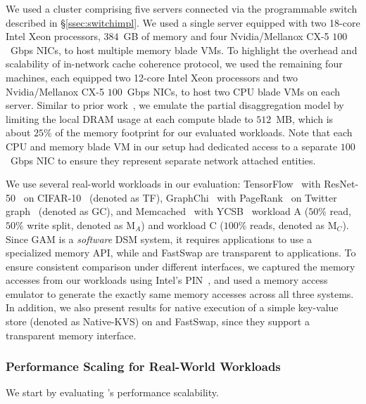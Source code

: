  We used a cluster comprising five servers connected via the programmable switch described in \S\ref{ssec:switchimpl}. We used a single server equipped with two 18-core Intel Xeon processors, $384$~GB of memory and four Nvidia/Mellanox CX-5 $100$~Gbps NICs, to host multiple memory blade VMs. To highlight the overhead and scalability of in-network cache coherence protocol, we used the remaining four machines, each equipped two 12-core Intel Xeon processors and two Nvidia/Mellanox CX-5 $100$~Gbps NICs, to host two CPU blade VMs on each server. Similar to prior work~\cite{legoos}, we emulate the partial disaggregation model by limiting the local DRAM usage at each compute blade to $512$~MB, which is about $25\%$ of the memory footprint for our evaluated workloads. Note that each CPU and memory blade VM in our setup had dedicated access to a separate $100$~Gbps NIC to ensure they represent separate network attached entities.

 We use several real-world workloads in our evaluation: TensorFlow~\cite{tensorflow} with ResNet-50~\cite{resnet} on CIFAR-10~\cite{cifar10} (denoted as TF), GraphChi~\cite{graphchi} with PageRank~\cite{pagerank} on Twitter graph~\cite{twitter_graph} (denoted as GC), and Memcached~\cite{memcached} with YCSB~\cite{ycsb_workload} workload A ($50\%$ read, $50\%$ write split, denoted as M$_A$) and workload C ($100\%$ reads, denoted as M$_C$). Since GAM is a \textit{software} DSM system, it requires applications to use a specialized memory API, while \mind and FastSwap are transparent to applications. To ensure consistent comparison under different interfaces, we captured the memory accesses from our workloads using Intel's PIN~\cite{intel_pin}, and used a memory access emulator to generate the exactly same memory accesses across all three systems. In addition, we also present results for native execution of a simple key-value store (denoted as Native-KVS) on \mind and FastSwap, since they support a transparent memory interface.

\subsubsection{Performance Scaling for Real-World Workloads}
\label{sssec:macro_bench}

We start by evaluating \mind's performance scalability.

